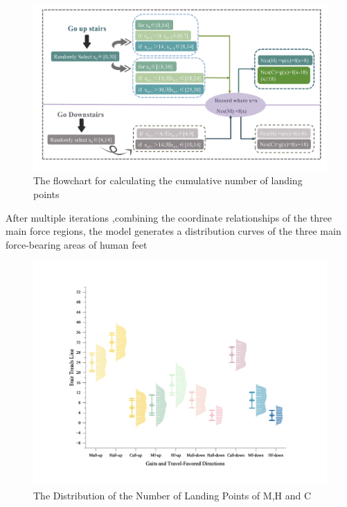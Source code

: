 \documentclass{mcmthesis}
\begin{document}
  
  \begin{figure}[h]  %
    \small
    \centering  %
    \includegraphics[width=12cm]{9-The flowchart for calculating the cumulative number of landing points.png}
    \caption{The flowchart for calculating the cumulative number of landing points} \label{fig:2}  %
    \end{figure}  %
  
  
  After multiple iterations ,combining the coordinate relationships of the three main force regions, the model generates a distribution curves of the three main force-bearing areas of human feet
  \newpage
  
  \begin{figure}[h]  %
    \small
    \centering  %
    \includegraphics[width=12cm]{10-The Distribution of the Number of Landing Points of M,H and C.png}
    \caption{The Distribution of the Number of Landing Points of M,H and C} \label{fig:2}  %
    \end{figure}  %
  
\end{document}
